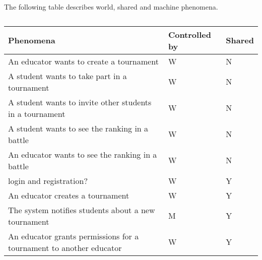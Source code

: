 The following table describes world, shared and machine phenomena.
\begin{center} %
    \begin{longtable}{|p{8.7cm}|p{3cm}|p{3cm}|}
        \caption[Phenomena Table]{}
        \label{table:phenomena}
        \endlastfoot
        \hline
        \rowcolor{gray!50}
        \textbf{Phenomena}                                                                                                                    & \textbf{Controlled by} & \textbf{Shared} \\ \hline
        An educator wants to create a tournament                                                                                              & W                      & N               \\ \hline
        A student wants to take part in a tournament                                                                                          & W                      & N               \\ \hline
        A student wants to invite other students in a tournament                                                                              & W                      & N               \\ \hline
        A student wants to see the ranking in a battle                                                                                        & W                      & N               \\ \hline
        An educator wants to see the ranking in a battle                                                                                      & W                      & N               \\ \hline
        login and registration?                                                                                                               & W                      & Y               \\ \hline
        An educator creates a tournament                                                                                                      & W                      & Y               \\ \hline
        The system notifies students about a new tournament                                                                                   & M                      & Y               \\ \hline
        An educator grants permissions for a tournament to another educator                                                                   & W                      & Y               \\ \hline

\end{longtable}
\end{center}
